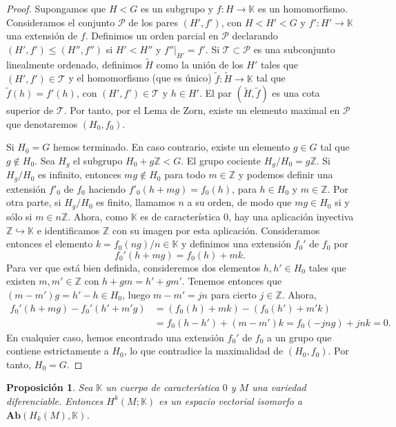 \documentclass[12pt,a4paper]{book}
\newtheorem{prop}[thm]{Proposición}
\theoremstyle{definition} \newtheorem{defn}[thm]{Definición}
\theoremstyle{definition} \newtheorem{ejemplo}[thm]{Ejemplo}
\theoremstyle{definition} \newtheorem{ejercicio}[thm]{Ejercicio}
\theoremstyle{remark} \newtheorem*{obs}{Observación}
\def\ZZ{\mathbb{Z}}
\def\KK{\mathbb{K}}
\begin{document}
\begin{proof}
  Supongamos que $H<G$ es un subgrupo y $f:H\rightarrow \KK$ es un homomorfismo. Consideramos el conjunto $\mathscr{P}$ de los pares $(H',f')$, con $H<H'<G$ y $f':H'\rightarrow \KK$ una extensión de $f$. Definimos un orden parcial en $\mathscr{P}$ declarando $(H',f')\leq(H'',f'')$ si $H'<H''$ y $f''|_{H'}=f'$. Si $\mathscr{T}\subset \mathscr{P}$ es una subconjunto linealmente ordenado, definimos $\tilde{H}$ como la unión de los $H'$ tales que $(H',f')\in \mathscr{T}$ y el homomorfismo (que es único) $\tilde{f}:\tilde{H}\rightarrow \KK$ tal que $\tilde{f}(h) = f'(h)$, con $(H',f') \in \mathscr{T}$ y $h\in H'$. El par $(\tilde{H},\tilde{f})$ es una cota superior de $\mathscr{T}$. Por tanto, por el Lema de Zorn, existe un elemento maximal en $\mathscr{P}$ que denotaremos $(H_0,f_0)$.

  Si $H_0=G$ hemos terminado. En caso contrario, existe un elemento $g\in G$ tal que $g\not\in H_0$. Sea $H_g$ el subgrupo $H_0+g\ZZ<G$. El grupo cociente $H_g/H_0=g\ZZ$. Si $H_g/H_0$ es infinito, entonces $m g \not\in H_0$ para todo $m\in \ZZ$ y podemos definir una extensión $f'_0$ de $f_0$ haciendo $f'_0(h+mg)=f_0(h)$, para $h\in H_0$ y $m\in \ZZ$. Por otra parte, si $H_g/H_0$ es finito, llamamos $n$ a su orden, de modo que $mg\in H_0$ si y sólo si $m\in n\ZZ$. Ahora, como $\KK$ es de característica $0$, hay una aplicación inyectiva $\ZZ \hookrightarrow \KK$ e identificamos $\ZZ$ con su imagen por esta aplicación. Consideramos entonces el elemento $k=f_0(ng)/n \in \KK$ y definimos una extensión $f_0'$ de $f_0$ por
  \begin{equation*}
    f_0'(h+mg)=f_0(h)+mk.
  \end{equation*}
  Para ver que está bien definida, consideremos dos elementos $h,h' \in H_0$ tales que existen $m,m'\in \ZZ$ con $h+gm=h'+gm'$. Tenemos entonces que $(m-m')g=h'-h\in H_0$, luego $m-m'=jn$ para cierto $j\in \ZZ$. Ahora,
  \begin{align*}
    f_0'(h+mg)-f_0'(h'+m'g)&=(f_0(h)+mk)-(f_0(h')+m'k)\\&=f_0(h-h')+(m-m')k=f_0(-jng)+jnk =0.
  \end{align*}
En cualquier caso, hemos encontrado una extensión $f_0'$ de $f_0$ a un grupo que contiene estrictamente a $H_0$, lo que contradice la maximalidad de $(H_0,f_0)$. Por tanto, $H_0=G$.
\end{proof}

\begin{prop}
  Sea $\KK$ un cuerpo de característica $0$ y $M$ una variedad diferenciable. Entonces $H^k(M;\KK)$ es un espacio vectorial isomorfo a $\mathbf{Ab}(H_k(M),\KK)$.
\end{prop}
\end{document}
